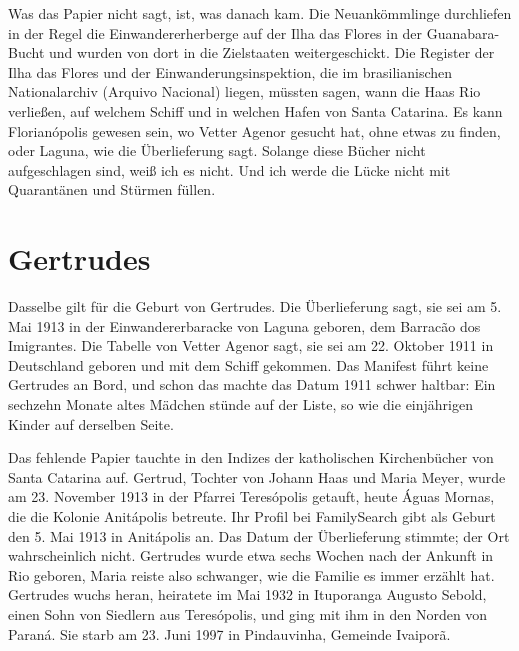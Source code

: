 \documentclass[
  ngerman,
  11pt,
  openany]{book}
\begin{document}
Was das Papier nicht sagt, ist, was danach kam. Die Neuankömmlinge
durchliefen in der Regel die Einwandererherberge auf der Ilha das Flores
in der Guanabara-Bucht und wurden von dort in die Zielstaaten
weitergeschickt. Die Register der Ilha das Flores und der
Einwanderungsinspektion, die im brasilianischen Nationalarchiv (Arquivo
Nacional) liegen, müssten sagen, wann die Haas Rio verließen, auf
welchem Schiff und in welchen Hafen von Santa Catarina. Es kann
Florianópolis gewesen sein, wo Vetter Agenor gesucht hat, ohne etwas zu
finden, oder Laguna, wie die Überlieferung sagt. Solange diese Bücher
nicht aufgeschlagen sind, weiß ich es nicht. Und ich werde die Lücke
nicht mit Quarantänen und Stürmen füllen.

\section{Gertrudes}\label{gertrudes}

Dasselbe gilt für die Geburt von Gertrudes. Die Überlieferung sagt, sie
sei am 5. Mai 1913 in der Einwandererbaracke von Laguna geboren, dem
Barracão dos Imigrantes. Die Tabelle von Vetter Agenor sagt, sie sei am
22. Oktober 1911 in Deutschland geboren und mit dem Schiff gekommen. Das
Manifest führt keine Gertrudes an Bord, und schon das machte das Datum
1911 schwer haltbar: Ein sechzehn Monate altes Mädchen stünde auf der
Liste, so wie die einjährigen Kinder auf derselben Seite.

Das fehlende Papier tauchte in den Indizes der katholischen
Kirchenbücher von Santa Catarina auf. Gertrud, Tochter von Johann Haas
und Maria Meyer, wurde am 23. November 1913 in der Pfarrei Teresópolis
getauft, heute Águas Mornas, die die Kolonie Anitápolis betreute. Ihr
Profil bei FamilySearch gibt als Geburt den 5. Mai 1913 in Anitápolis
an. Das Datum der Überlieferung stimmte; der Ort wahrscheinlich nicht.
Gertrudes wurde etwa sechs Wochen nach der Ankunft in Rio geboren, Maria
reiste also schwanger, wie die Familie es immer erzählt hat. Gertrudes
wuchs heran, heiratete im Mai 1932 in Ituporanga Augusto Sebold, einen
Sohn von Siedlern aus Teresópolis, und ging mit ihm in den Norden von
Paraná. Sie starb am 23. Juni 1997 in Pindauvinha, Gemeinde Ivaiporã.
\end{document}
